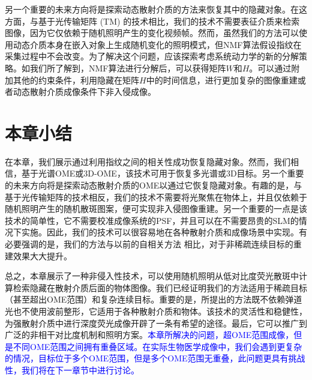 另一个重要的未来方向将是探索动态散射介质的方法来恢复其中的隐藏对象。在这方面，与基于光传输矩阵 (TM) 的技术相比，我们的技术不需要表征介质来检索图像，因为它仅依赖于随机照明产生的变化视频帧。然而，虽然我们的方法可以使用动态介质本身在嵌入对象上生成随机变化的照明模式，但NMF算法假设指纹在采集过程中不会改变。为了解决这个问题，应该探索考虑系统动力学的新的分解策略。如我们所了解到，NMF算法进行分解后，可以获得矩阵$W$和$H$。可以通过附加其他的约束条件，利用隐藏在矩阵$H$中的时间信息，进行更加复杂的图像重建或者动态散射介质成像条件下非入侵成像。

\section{本章小结}

在本章，我们展示通过利用指纹之间的相关性成功恢复隐藏对象。然而，我们相信，基于光谱OME或3D-OME，该技术可用于恢复多光谱或3D目标。另一个重要的未来方向将是探索动态散射介质的OME以通过它恢复隐藏对象。有趣的是，与基于光传输矩阵的技术相反，我们的技术不需要将光聚焦在物体上，并且仅依赖于随机照明产生的随机散斑图案，便可实现非入侵图像重建。另一个重要的一点是该技术的简单性，它不需要校准成像系统的PSF\cite{Antipa2018}，并且可以在不需要昂贵的SLM的情况下实施。因此，我们的技术可以很容易地在各种散射介质和成像场景中实现。有必要强调的是，我们的方法与以前的自相关方法 \cite{bertolotti_non-invasive_2012,katz_non-invasive_2014} 相比，对于非稀疏连续目标的重建效果大大提升。

总之，本章展示了一种非侵入性技术，可以使用随机照明从低对比度荧光散斑中计算检索隐藏在散射介质后面的物体图像。我们已经证明我们的方法适用于稀疏目标（甚至超出OME范围）和复杂连续目标。重要的是，所提出的方法既不依赖弹道光也不使用波前整形，它适用于各种散射介质和物体。该技术的灵活性和稳健性，为强散射介质中进行深度荧光成像开辟了一条有希望的途径。最后，它可以推广到广泛的非相干对比度机制和照明方案。\textcolor{blue}{本章所解决的问题，超OME范围成像，但是不同OME范围之间拥有重叠区域。在实际生物医学成像中，我们会遇到更复杂的情况，目标位于多个OME范围，但是多个OME范围无重叠，此问题更具有挑战性，我们将在下一章节中进行讨论。}

